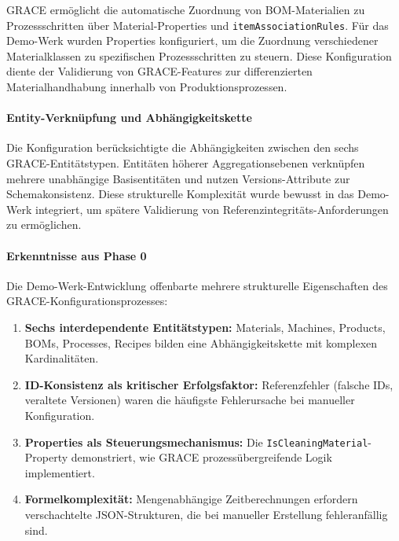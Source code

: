 GRACE ermöglicht die automatische Zuordnung von BOM-Materialien zu Prozessschritten über Material-Properties und \texttt{itemAssociationRules}. Für das Demo-Werk wurden Properties konfiguriert, um die Zuordnung verschiedener Materialklassen zu spezifischen Prozessschritten zu steuern. Diese Konfiguration diente der Validierung von GRACE-Features zur differenzierten Materialhandhabung innerhalb von Produktionsprozessen.

\paragraph{Entity-Verknüpfung und Abhängigkeitskette}

Die Konfiguration berücksichtigte die Abhängigkeiten zwischen den sechs GRACE-Entitätstypen. Entitäten höherer Aggregationsebenen verknüpfen mehrere unabhängige Basisentitäten und nutzen Versions-Attribute zur Schemakonsistenz. Diese strukturelle Komplexität wurde bewusst in das Demo-Werk integriert, um spätere Validierung von Referenzintegritäts-Anforderungen zu ermöglichen.

\paragraph{Erkenntnisse aus Phase 0}

Die Demo-Werk-Entwicklung offenbarte mehrere strukturelle Eigenschaften des GRACE-Konfigurationsprozesses:

\begin{enumerate}
    \item \textbf{Sechs interdependente Entitätstypen:} Materials, Machines, Products, BOMs, Processes, Recipes bilden eine Abhängigkeitskette mit komplexen Kardinalitäten.

    \item \textbf{ID-Konsistenz als kritischer Erfolgsfaktor:} Referenzfehler (falsche IDs, veraltete Versionen) waren die häufigste Fehlerursache bei manueller Konfiguration.

    \item \textbf{Properties als Steuerungsmechanismus:} Die \texttt{IsCleaningMaterial}-Property demonstriert, wie GRACE prozessübergreifende Logik implementiert.

    \item \textbf{Formelkomplexität:} Mengenabhängige Zeitberechnungen erfordern verschachtelte JSON-Strukturen, die bei manueller Erstellung fehleranfällig sind.
\end{enumerate}

